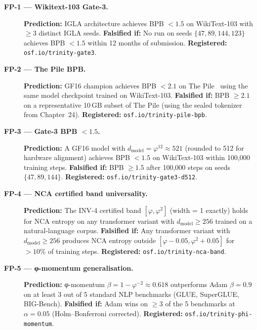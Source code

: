 \begin{description}

\item[\textbf{FP-1 — Wikitext-103 Gate-3.}]
  \textbf{Prediction:} IGLA architecture achieves BPB $< 1.5$ on WikiText-103
  with $\geq 3$ distinct IGLA seeds.
  \textbf{Falsified if:} No run on seeds $\{47, 89, 144, 123\}$ achieves
  BPB $< 1.5$ within 12 months of submission.
  \textbf{Registered:} \texttt{osf.io/trinity-gate3}.

\item[\textbf{FP-2 — The Pile BPB.}]
  \textbf{Prediction:} GF16 champion achieves BPB $< 2.1$ on
  The Pile~\cite{gao2020pile} using the same model checkpoint trained on
  WikiText-103.
  \textbf{Falsified if:} BPB $\geq 2.1$ on a representative 10\,GB subset of
  The Pile (using the sealed tokenizer from Chapter~24).
  \textbf{Registered:} \texttt{osf.io/trinity-pile-bpb}.

\item[\textbf{FP-3 — Gate-3 BPB $< 1.5$.}]
  \textbf{Prediction:} A GF16 model with $d_{\mathrm{model}} = \varphi^{12}
  \approx 521$ (rounded to 512 for hardware alignment) achieves BPB $< 1.5$
  on WikiText-103 within 100,000 training steps.
  \textbf{Falsified if:} BPB $\geq 1.5$ after 100,000 steps on seeds
  $\{47, 89, 144\}$.
  \textbf{Registered:} \texttt{osf.io/trinity-gate3-d512}.

\item[\textbf{FP-4 — NCA certified band universality.}]
  \textbf{Prediction:} The INV-4 certified band $[\varphi, \varphi^{2}]$ (width
  = 1 exactly) holds for NCA entropy on any transformer variant with
  $d_{\mathrm{model}} \geq 256$ trained on a natural-language corpus.
  \textbf{Falsified if:} Any transformer variant with $d_{\mathrm{model}} \geq 256$
  produces NCA entropy outside $[\varphi - 0.05, \varphi^{2} + 0.05]$ for
  $> 10\%$ of training steps.
  \textbf{Registered:} \texttt{osf.io/trinity-nca-band}.

\item[\textbf{FP-5 — φ-momentum generalisation.}]
  \textbf{Prediction:} φ-momentum $\beta = 1 - \varphi^{-2} \approx 0.618$
  outperforms Adam $\beta = 0.9$ on at least 3 out of 5 standard NLP benchmarks
  (GLUE, SuperGLUE, BIG-Bench).
  \textbf{Falsified if:} Adam wins on $\geq 3$ of the 5 benchmarks at $\alpha
  = 0.05$ (Holm--Bonferroni corrected).
  \textbf{Registered:} \texttt{osf.io/trinity-phi-momentum}.

\end{description}


